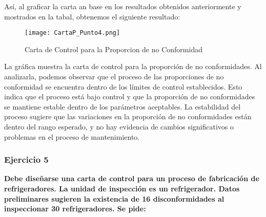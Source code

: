 \documentclass{article}
\begin{document}
\newpage

Así, al graficar la carta an base en los resultados obtenidos anteriormente y mostrados en la tabal, obtenemos el siguiente resultado: 

\begin{figure}[h]
    \centering
    \texttt{[image: CartaP\_Punto4.png]}
    \caption{Carta de Control para la Proporcion de no Conformidad}
    \label{fig:CartaP-NoConformida}
\end{figure}

La gráfica muestra la carta de control para la proporción de no conformidades. Al analizarla, podemos observar que el proceso de las proporciones de no conformidad se encuentra dentro de los límites de control establecidos. Esto indica que el proceso está bajo control y que la proporción de no conformidades se mantiene estable dentro de los parámetros aceptables. La estabilidad del proceso sugiere que las variaciones en la proporción de no conformidades están dentro del rango esperado, y no hay evidencia de cambios significativos o problemas en el proceso de mantenimiento.


\subsubsection*{Ejercicio 5} \textbf{Debe diseñarse una carta de control para un proceso de fabricación de refrigeradores. La unidad de inspección es un refrigerador. Datos preliminares sugieren la existencia de 16 disconformidades al inspeccionar 30 refrigeradores. Se pide:}
\end{document}

